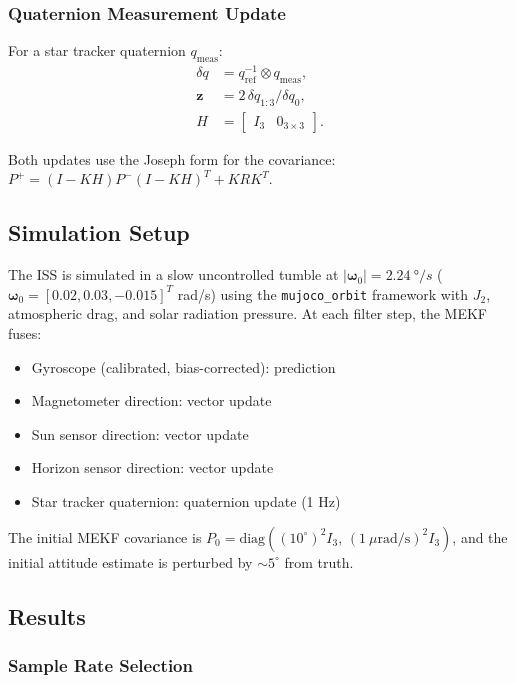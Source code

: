 \documentclass[conference]{IEEEtran}
\begin{document}
\subsubsection{Quaternion Measurement Update}

For a star tracker quaternion $q_{\text{meas}}$:
\begin{align}
  \delta q &= q_{\text{ref}}^{-1} \otimes q_{\text{meas}}, \\
  \bm{z} &= 2\,\delta q_{1:3} / \delta q_0, \\
  H &= \begin{bmatrix} I_3 & 0_{3\times3} \end{bmatrix}.
\end{align}

Both updates use the Joseph form for the covariance:
$P^+ = (I - KH)P^-(I - KH)^T + KRK^T$.

\subsection{Simulation Setup}

The ISS is simulated in a slow uncontrolled tumble at
$|\bm{\omega}_0| = 2.24~\si{\degree/s}$ ($\bm{\omega}_0 = [0.02, 0.03, -0.015]^T$ rad/s)
using the \texttt{mujoco\_orbit} framework with $J_2$, atmospheric drag,
and solar radiation pressure.  At each filter step, the MEKF fuses:
\begin{itemize}
  \item Gyroscope (calibrated, bias-corrected): prediction
  \item Magnetometer direction: vector update
  \item Sun sensor direction: vector update
  \item Horizon sensor direction: vector update
  \item Star tracker quaternion: quaternion update (1 Hz)
\end{itemize}

The initial MEKF covariance is $P_0 = \text{diag}((10^\circ)^2 I_3,\, (1~\mu\text{rad/s})^2 I_3)$,
and the initial attitude estimate is perturbed by $\sim$$5^\circ$ from truth.

\subsection{Results}

\subsubsection{Sample Rate Selection}
\end{document}
